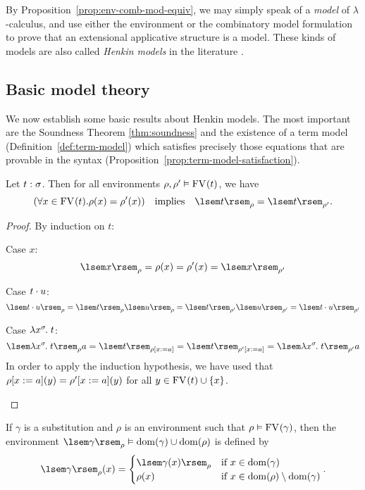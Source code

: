 By Proposition~\ref{prop:env-comb-mod-equiv}, we may simply speak of a \textit{model} of $\lambda$-calculus, and use either the environment or the combinatory model formulation to prove that an extensional applicative structure is a model. These kinds of models are also called \emph{Henkin models} in the literature \cite{DBLP:books/el/leeuwen90/Mitchell90}.

\subsection{Basic model theory}
We now establish some basic results about Henkin models. The most important are the Soundness Theorem \ref{thm:soundness} and the existence of a term model (Definition~\ref{def:term-model}) which satisfies precisely those equations that are provable in the syntax (Proposition~\ref{prop:term-model-satisfaction}).

\begin{lem} \label{lem:int-different-envs}
Let $\typedtm{t}{\sigma}$. Then for all environments $\typedenv{\rho, \rho'}{\FV{t}}$, we have
\[ (\forall x \in \FV{t}. \rho(x) = \rho'(x)) \quad\text{implies}\quad
    \sint{t}{\rho} = \sint{t}{\rho'}. \]
\begin{proof}
By induction on $t$:
\begin{items}
\item Case $x$:
\[ \sint{x}{\rho} = \rho(x) = \rho'(x) = \sint{x}{\rho'} \]
\item Case $\app{t}{u}$:
\[ \sint{\app{t}{u}}{\rho} = \sint{t}{\rho} \sint{u}{\rho}
    = \sint{t}{\rho'} \sint{u}{\rho'} = \sint{\app{t}{u}}{\rho'} \]
\item Case $\lamv{x}{\sigma}{t}$:
\[ \sint{\lamv{x}{\sigma}{t}}{\rho} a = \sint{t}{\updenv{\rho}{x}{a}}
    = \sint{t}{\updenv{\rho'}{x}{a}} = \sint{\lamv{x}{\sigma}{t}}{\rho'} a \]
In order to apply the induction hypothesis, we have used that $\updenv{\rho}{x}{a}(y) = \updenv{\rho'}{x}{a}(y)$ for all $y \in \FV{t} \cup \singset[x]$. \qedhere
\end{items}
\end{proof}
\end{lem}

\begin{defn}
If $\gamma$ is a substitution and $\rho$ is an environment such that $\typedenv{\rho}{\FV{\gamma}}$, then the environment $\typedenv{\sintsub{\gamma}{\rho}}{\dom{\gamma} \cup \dom{\rho}}$ is defined by
\[ \sintsub{\gamma}{\rho}(x) = \begin{cases}
                               \sint{\gamma(x)}{\rho} & \text{if } x \in \dom{\gamma} \\
                               \rho(x) & \text{if } x \in \dom{\rho} \setminus \dom{\gamma}
                               \end{cases}. \]
\end{defn}

